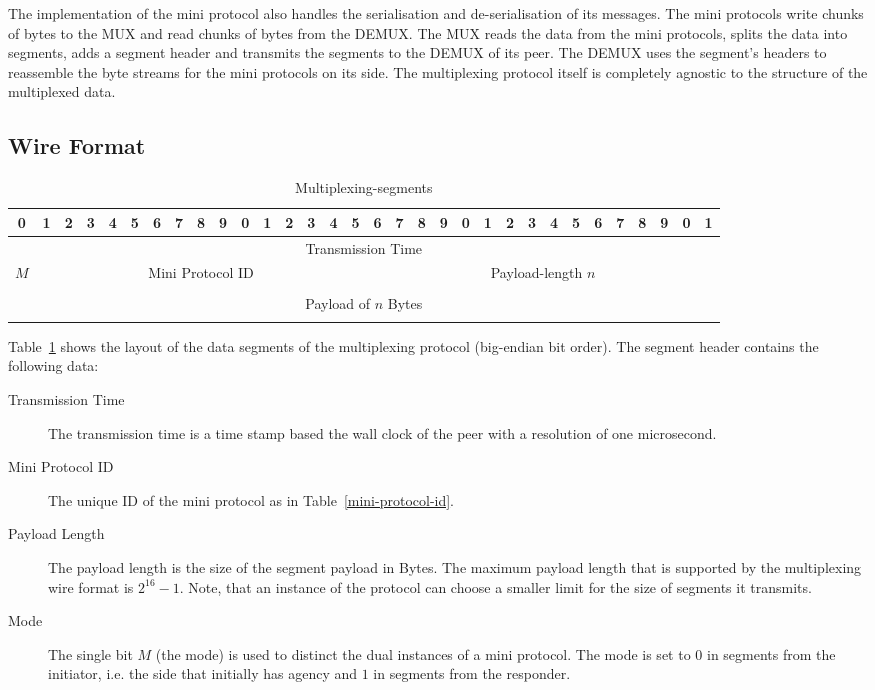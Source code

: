 \documentclass{report}
\newcommand{\hsref}[1]{}
\theoremstyle{definition}{
  \newtheorem{lemma}{Lemma}[section] %
  \newtheorem{definition}[lemma]{Definition}
}
\theoremstyle{theorem}{
  \newtheorem{invariant}[lemma]{Invariant}
  \newtheorem{proofobligation}[lemma]{Proof Obligation}
}
\numberwithin{equation}{lemma}
\begin{document}
The implementation of the mini protocol also handles the serialisation and de-serialisation of its messages.
The mini protocols write chunks of bytes to the MUX and read chunks of bytes from the DEMUX.
The MUX reads the data from the mini protocols, splits the data into segments, adds a segment header
and transmits the segments to the DEMUX of its peer.
The DEMUX uses the segment's headers to reassemble the byte streams for the mini protocols on its side.
The multiplexing protocol itself is completely agnostic to the structure of the multiplexed data.

\subsection{Wire Format}
\hsref{ouroboros-network/src/Ouroboros/Network/Mux/Egress.hs}
\begin{table}[h]
\centering
\begingroup
\setlength{\tabcolsep}{3pt}
\begin{tabular}{|c|c|c|c|c|c|c|c|c|c|c|c|c|c|c|c|c|c|c|c|c|c|c|c|c|c|c|c|c|c|c|c|}
  \hline
  0&1&2&3&4&5&6&7&8&9&0&1&2&3&4&5&6&7&8&9&0&1&2&3&4&5&6&7&8&9&0&1 \\ \hline
  \multicolumn{32}{|c|}{Transmission Time} \\ \hline
  \multicolumn{1}{|c|}{$M$}
  &\multicolumn{15}{|c|}{Mini Protocol ID}
  &\multicolumn{16}{|c|}{Payload-length $n$} \\ \hline
  \multicolumn{32}{|c|}{} \\
  \multicolumn{32}{|c|}{Payload of $n$ Bytes} \\
  \multicolumn{32}{|c|}{} \\ \hline
\end{tabular}
\endgroup
\caption{Multiplexing-segments}
\label{segment-header}
\end{table}

Table~\ref{segment-header} shows the layout of the data segments of the multiplexing protocol
(big-endian bit order).
The segment header contains the following data:
\begin{description}
\item[Transmission Time]
  The transmission time is a time stamp based the wall clock of the peer with a
  resolution of one microsecond.
\item[Mini Protocol ID] The unique ID of the mini protocol as in Table~\ref{mini-protocol-id}.
\item[Payload Length] The payload length is the size of the segment payload in Bytes.
  The maximum payload length that is supported by the multiplexing wire format is $2^{16}-1$.
  Note, that an instance of the protocol can choose a smaller limit for the size of segments it transmits.
\item[Mode] The single bit $M$ (the mode) is used to distinct the dual instances of a mini protocol.
  The mode is set to $0$ in segments from the initiator, i.e. the side that initially has agency and
  $1$ in segments from the responder.
\end{description}
\end{document}
